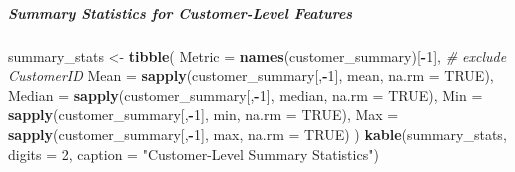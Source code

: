 \documentclass[
]{article}
\newenvironment{Shaded}{\begin{snugshade}}{\end{snugshade}}
\newcommand{\AttributeTok}[1]{\textcolor[rgb]{0.13,0.29,0.53}{#1}}
\newcommand{\CommentTok}[1]{\textcolor[rgb]{0.56,0.35,0.01}{\textit{#1}}}
\newcommand{\ConstantTok}[1]{\textcolor[rgb]{0.56,0.35,0.01}{#1}}
\newcommand{\DecValTok}[1]{\textcolor[rgb]{0.00,0.00,0.81}{#1}}
\newcommand{\FunctionTok}[1]{\textcolor[rgb]{0.13,0.29,0.53}{\textbf{#1}}}
\newcommand{\NormalTok}[1]{#1}
\newcommand{\OtherTok}[1]{\textcolor[rgb]{0.56,0.35,0.01}{#1}}
\newcommand{\SpecialCharTok}[1]{\textcolor[rgb]{0.81,0.36,0.00}{\textbf{#1}}}
\newcommand{\StringTok}[1]{\textcolor[rgb]{0.31,0.60,0.02}{#1}}
\begin{document}
\subparagraph{Summary Statistics for Customer-Level
Features}\label{summary-statistics-for-customer-level-features}

\begin{Shaded}
\begin{Highlighting}[]
\NormalTok{summary\_stats }\OtherTok{\textless{}{-}} \FunctionTok{tibble}\NormalTok{(}
  \AttributeTok{Metric =} \FunctionTok{names}\NormalTok{(customer\_summary)[}\SpecialCharTok{{-}}\DecValTok{1}\NormalTok{],  }\CommentTok{\# exclude CustomerID}
  \AttributeTok{Mean =} \FunctionTok{sapply}\NormalTok{(customer\_summary[,}\SpecialCharTok{{-}}\DecValTok{1}\NormalTok{], mean, }\AttributeTok{na.rm =} \ConstantTok{TRUE}\NormalTok{),}
  \AttributeTok{Median =} \FunctionTok{sapply}\NormalTok{(customer\_summary[,}\SpecialCharTok{{-}}\DecValTok{1}\NormalTok{], median, }\AttributeTok{na.rm =} \ConstantTok{TRUE}\NormalTok{),}
  \AttributeTok{Min =} \FunctionTok{sapply}\NormalTok{(customer\_summary[,}\SpecialCharTok{{-}}\DecValTok{1}\NormalTok{], min, }\AttributeTok{na.rm =} \ConstantTok{TRUE}\NormalTok{),}
  \AttributeTok{Max =} \FunctionTok{sapply}\NormalTok{(customer\_summary[,}\SpecialCharTok{{-}}\DecValTok{1}\NormalTok{], max, }\AttributeTok{na.rm =} \ConstantTok{TRUE}\NormalTok{)}
\NormalTok{)}
\FunctionTok{kable}\NormalTok{(summary\_stats, }\AttributeTok{digits =} \DecValTok{2}\NormalTok{, }\AttributeTok{caption =} \StringTok{"Customer{-}Level Summary Statistics"}\NormalTok{)}
\end{Highlighting}
\end{Shaded}
\end{document}
